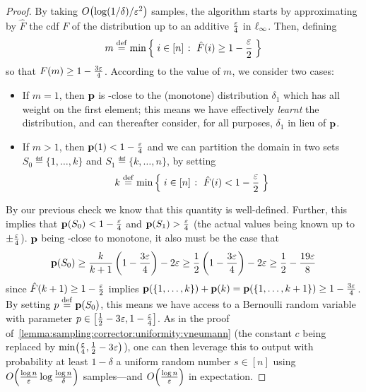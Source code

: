 \begin{proof}
By taking $\bigO{\log(1/\delta)/\eps^2}$ samples, the algorithm starts by approximating by $\hat{F}$ the cdf $F$ of the distribution up to an additive $\frac{\eps}{4}$ in $\lp[\infty]$. Then, defining
\[
    m \eqdef \min \setOfSuchThat{i \in [n]}{ \hat{F}(i) \geq 1-\frac{\eps}{2}}
\]
so that $F(m) \geq 1-\frac{3\eps}{4}$. According to the value of $m$, we consider two cases:
\begin{itemize}
  \item If $m = 1$, then $\D$ is \eps-close to the (monotone) distribution $\delta_1$ which has all weight on the first element; this means we have effectively \emph{learnt} the distribution, and can thereafter consider, for all purposes, $\delta_1$ in lieu of $\D$.  \item If $m > 1$, then $\D(1) < 1-\frac{\eps}{4}$ and we can partition the domain in two sets $S_0\eqdef\{1,\dots, k\}$ and $S_1\eqdef\{k,\dots, n\}$, by setting
\[
    k \eqdef \min \setOfSuchThat{i \in [n]}{ \hat{F}(i) < 1-\frac{\eps}{2}}
\]
\end{itemize}

By our previous check we know that this quantity is well-defined. Further, this implies that $\D(S_0) < 1-\frac{\eps}{4}$ and $\D(S_1) >\frac{\eps}{4}$  (the actual values being known up to $\pm \frac{\eps}{4}$). $\D$ being \eps-close to monotone, it also must be the case that
\[
  \D(S_0) \geq \frac{k}{k+1}\left(1-\frac{3\eps}{4}\right) - 2\eps \geq \frac{1}{2}\left(1-\frac{3\eps}{4}\right) - 2\eps \geq \frac{1}{2}-\frac{19\eps}{8}
\]
since $\hat{F}(k+1) \geq 1-\frac{\eps}{2}$ implies $\D(\{1,\dots,k\})+\D(k)=\D(\{1,\dots,k+1\}) \geq 1-\frac{3\eps}{4}$. By setting $p\eqdef \D(S_0)$, this means we have access to a Bernoulli random variable with parameter $p\in\left[\frac{1}{2}-3\eps,1-\frac{\eps}{4}\right]$. As in the proof of~\cref{lemma:sampling:corrector:uniformity:vneumann} (the constant $c$ being replaced by $\min\!\left(\frac{\eps}{4}, \frac{1}{2}-3\eps\right)$), one can then leverage this to output with probability at least $1-\delta$ a uniform random number $s\in[n]$ using $\bigO{\frac{\log n}{\eps} \log\frac{\log n}{\delta}}$ samples---and $\bigO{\frac{\log n}{\eps}}$ in expectation.
\end{proof}

